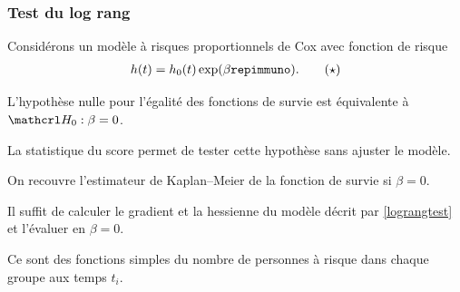 \documentclass{beamer}
\begin{document}
\begin{frame}[fragile]
\frametitle{Test du log rang}
 Considérons un modèle à risques proportionnels de Cox avec fonction de risque
 \begin{align} 
  h(t) = h_0(t)\exp(\beta \texttt{repimmuno}). \tag{$\star$} \label{lograngtest}
 \end{align}
\bi 
\item 
L'hypothèse nulle pour l'égalité des fonctions de survie est équivalente à $\Hy_0: \beta=0$. 
\item La statistique du score permet de tester cette hypothèse sans ajuster le modèle.
\bi \item On recouvre l'estimateur de Kaplan--Meier de la fonction de survie si $\beta=0$.
\ei
\item Il suffit de calculer le gradient et la hessienne du modèle décrit par \eqref{lograngtest} et l'évaluer en $\beta=0$. 
\bi
\item Ce sont des fonctions simples du nombre de personnes à risque dans chaque groupe aux temps $t_i$.
\ei 
\ei
\end{frame}
%  
%  
%  
\end{document}
